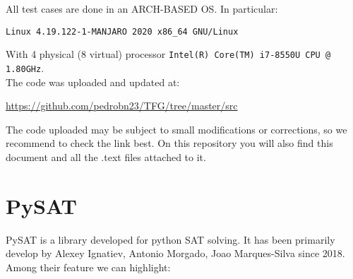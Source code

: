 All test cases are done in an ARCH-BASED OS. In particular:

  {\begin{center}
      \texttt{Linux 4.19.122-1-MANJARO  2020 x86\_64\ GNU/Linux}\\
    \end{center} }

  With 4 physical (8 virtual) processor \texttt{Intel(R) Core(TM) i7-8550U CPU @ 1.80GHz}. \\

  The code was uploaded and updated at:
\begin{center}
  \url{https://github.com/pedrobn23/TFG/tree/master/src}
\end{center}

The code uploaded may be subject to small modifications or corrections, so we recommend to check the link best. On this repository you will also find this document and all the .text files attached to it.  


\section{PySAT}
PySAT\cite{imms-sat18} is a library developed for python SAT solving. It has been primarily develop by Alexey Ignatiev, Antonio Morgado, Joao Marques-Silva since 2018. Among their feature we can highlight:

